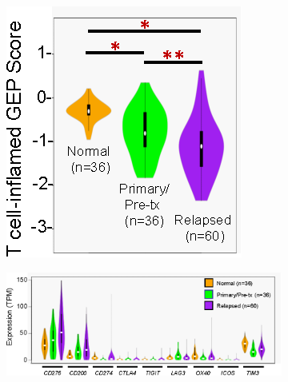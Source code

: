 \begin{figure}[htb]
    \hspace{0.08\textwidth}%
    \begin{subfigure}{0.206\textwidth}
        \includegraphics[width=\linewidth,keepaspectratio]{images/sclc/gep_violin_sclc}
        \caption{}\label{fig:sclc:gep_violin_sclc}
    \end{subfigure}%
    \hfill%
    \begin{subfigure}{0.584\textwidth}
        \includegraphics[width=\linewidth,keepaspectratio]{images/sclc/checkpoint_violin_sclc}
        \caption{}\label{fig:sclc:checkpoint_violin_sclc}
    \end{subfigure}%
    \hspace{0.08\textwidth}
    

\end{figure}

